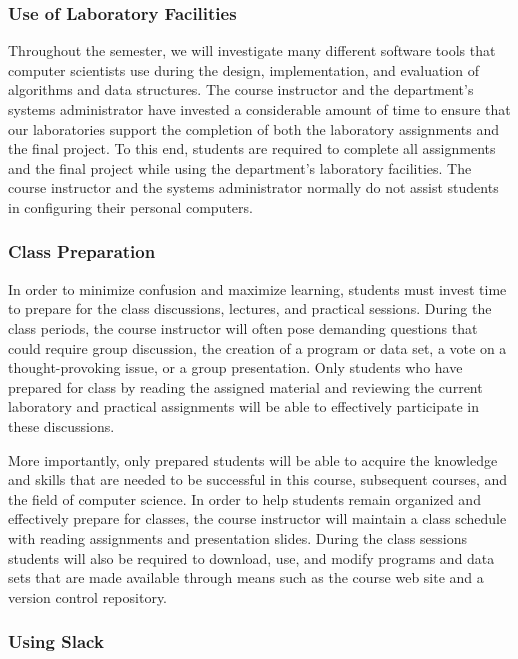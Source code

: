 \subsubsection*{Use of Laboratory Facilities}

Throughout the semester, we will investigate many different software tools that computer scientists use during the
design, implementation, and evaluation of algorithms and data structures.  The course instructor and the department's
systems administrator have invested a considerable amount of time to ensure that our laboratories support the completion
of both the laboratory assignments and the final project.  To this end, students are required to complete all
assignments and the final project while using the department's laboratory facilities. The course instructor and the
systems administrator normally do not assist students in configuring their personal computers.

\subsubsection*{Class Preparation}

In order to minimize confusion and maximize learning, students must invest time to prepare for the class discussions,
lectures, and practical sessions.  During the class periods, the course instructor will often pose demanding questions
that could require group discussion, the creation of a program or data set, a vote on a thought-provoking issue, or a
group presentation.  Only students who have prepared for class by reading the assigned material and reviewing the
current laboratory and practical assignments will be able to effectively participate in these discussions.

More importantly, only prepared students will be able to acquire the knowledge and skills that are needed to be
successful in this course, subsequent courses, and the field of computer science.  In order to help students remain
organized and effectively prepare for classes, the course instructor will maintain a class schedule with reading
assignments and presentation slides. During the class sessions students will also be required to download, use, and
modify programs and data sets that are made available through means such as the course web site and a version control
repository.

\subsubsection*{Using Slack}

